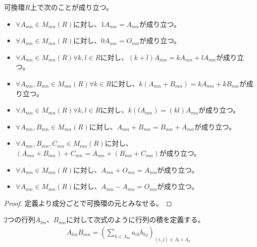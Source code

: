 \documentclass[dvipdfmx]{jsarticle}
\begin{document}
\begin{thm}\label{2.1.3.2}
可換環$R$上で次のことが成り立つ。
\begin{itemize}
\item
  $\forall A_{mn} \in M_{mn}(R)$に対し、$1A_{mn} = A_{mn}$が成り立つ。
\item
  $\forall A_{mn} \in M_{mn}(R)$に対し、$0A_{mn} = O_{mn}$が成り立つ。
\item
  $\forall A_{mn} \in M_{mn}(R)\forall k,l \in R$に対し、$(k + l)A_{mn} = kA_{mn} + lA_{mn}$が成り立つ。
\item
  $\forall A_{mn},B_{mn} \in M_{mn}(R)\forall k \in R$に対し、$k\left( A_{mn} + B_{mn} \right) = kA_{mn} + kB_{mn}$が成り立つ。
\item
  $\forall A_{mn} \in M_{mn}(R)\forall k,l \in R$に対し、$k\left( lA_{mn} \right) = (kl)A_{mn}$が成り立つ。
\item
  $\forall A_{mn},B_{mn} \in M_{mn}(R)$に対し、$A_{mn} + B_{mn} = B_{mn} + A_{mn}$が成り立つ。
\item
  $\forall A_{mn},B_{mn},C_{mn} \in M_{mn}(R)$に対し、$\left( A_{mn} + B_{mn} \right) + C_{mn} = A_{mn} + \left( B_{mn} + C_{mn} \right)$が成り立つ。
\item
  $\forall A_{mn} \in M_{mn}(R)$に対し、$A_{mn} + O_{mn} = A_{mn}$が成り立つ。
\item
  $\forall A_{mn} \in M_{mn}(R)$に対し、$A_{mn} - A_{mn} = O_{mn}$が成り立つ。
\end{itemize}
\end{thm}
\begin{proof}
定義より成分ごとで可換環の元とみなせる。
\end{proof}
\begin{dfn}
2つの行列$A_{lm}$、$B_{mn}$に対して次式のように行列の積を定義する。
\begin{align*}
A_{lm}B_{mn} = \left( \sum_{h \in \varLambda_{m}} {a_{ih}b_{hj}} \right)_{(i,j) \in \varLambda_{l} \times \varLambda_{n}}
\end{align*}
\end{dfn}
\end{document}

